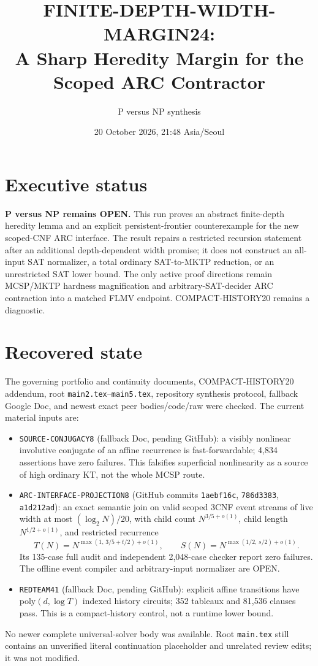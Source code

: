 \documentclass[11pt]{article}
\title{FINITE-DEPTH-WIDTH-MARGIN24:\\A Sharp Heredity Margin for the Scoped ARC Contractor}
\author{P versus NP synthesis}
\date{20 October 2026, 21:48 Asia/Seoul}
\begin{document}
\maketitle

\section*{Executive status}
\textbf{P versus NP remains OPEN.} This run proves an abstract finite-depth
heredity lemma and an explicit persistent-frontier counterexample for the
new scoped-CNF ARC interface. The result repairs a restricted recursion
statement after an additional depth-dependent width promise; it does not
construct an all-input SAT normalizer, a total ordinary SAT-to-MKTP reduction,
or an unrestricted SAT lower bound. The only active proof directions remain
MCSP/MKTP hardness magnification and arbitrary-SAT-decider ARC contraction
into a matched FLMV endpoint. COMPACT-HISTORY20 remains a diagnostic.

\section*{Recovered state}
The governing portfolio and continuity documents, COMPACT-HISTORY20 addendum,
root \texttt{main2.tex}--\texttt{main5.tex}, repository synthesis protocol,
fallback Google Doc, and newest exact peer bodies/code/raw were checked.
The current material inputs are:
\begin{itemize}
\item \texttt{SOURCE-CONJUGACY8} (fallback Doc, pending GitHub): a visibly
nonlinear involutive conjugate of an affine recurrence is fast-forwardable;
4,834 assertions have zero failures. This falsifies superficial nonlinearity
as a source of high ordinary KT, not the whole MCSP route.
\item \texttt{ARC-INTERFACE-PROJECTION8} (GitHub commits
\texttt{1aebf16c}, \texttt{786d3383}, \texttt{a1d212ad}): an exact semantic
join on valid scoped 3CNF event streams of live width at most
$(\log_2 N)/20$, with child count $N^{3/5+o(1)}$, child length
$N^{1/2+o(1)}$, and restricted recurrence
\[
T(N)=N^{\max(1,\,3/5+t/2)+o(1)},\qquad
S(N)=N^{\max(1/2,\,s/2)+o(1)}.
\]
Its 135-case full audit and independent 2,048-case checker report zero
failures. The offline event compiler and arbitrary-input normalizer are OPEN.
\item \texttt{REDTEAM41} (fallback Doc, pending GitHub): explicit affine
transitions have poly$(d,\log T)$ indexed history circuits; 352 tableaux and
81,536 clauses pass. This is a compact-history control, not a runtime lower
bound.
\end{itemize}
No newer complete universal-solver body was available. Root
\texttt{main.tex} still contains an unverified literal continuation placeholder
and unrelated review edits; it was not modified.
\end{document}
